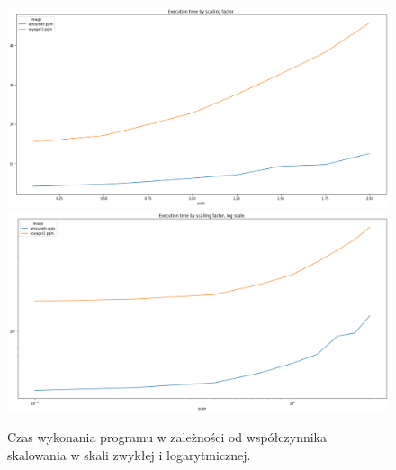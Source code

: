 \documentclass{article}
\begin{document}
        \begin{figure}[htb]
            \centering
            \includegraphics[width=\textwidth]{cuda/Lab2/report/images/image_by_scale.png}
            \includegraphics[width=\textwidth]{cuda/Lab2/report/images/image_by_scale_log.png}
            \caption{Czas wykonania programu w zależności od współczynnika skalowania w skali zwykłej i logarytmicznej.}
        \end{figure}
\end{document}
